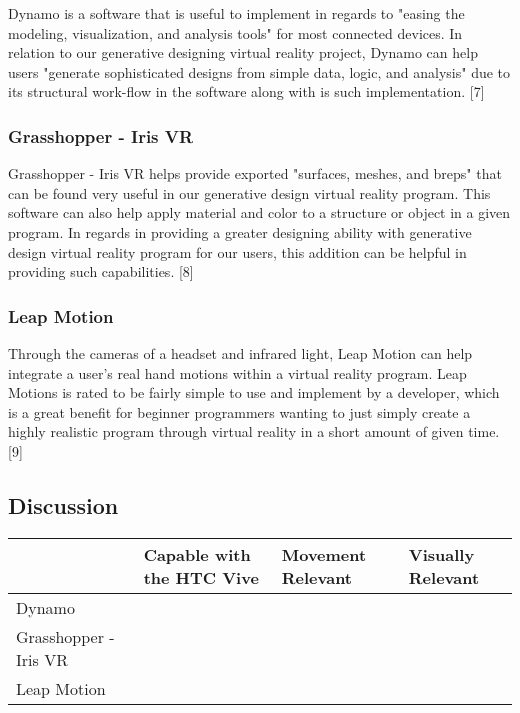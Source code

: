 \documentclass[letterpaper,10pt,onecolumn,compsoc]{IEEEtran}
\begin{document}

\noindent
Dynamo is a software that is useful to implement in regards to "easing the modeling, visualization, and analysis tools" for most connected devices. In relation to our generative designing virtual reality project, Dynamo can help users "generate sophisticated designs from simple data, logic, and analysis" due to its structural work-flow in the software along with is such implementation. [7]

\subsubsection{Grasshopper - Iris VR}


\noindent
Grasshopper - Iris VR helps provide exported "surfaces, meshes, and breps" that can be found very useful in our generative design virtual reality program. This software can also help apply material and color to a structure or object in a given program. In regards in providing a greater designing ability with generative design virtual reality program for our users, this addition can be helpful in providing such capabilities. [8] 

\subsubsection{Leap Motion}


\noindent
Through the cameras of a headset and infrared light, Leap Motion can help integrate a user's real hand motions within a virtual reality program. Leap Motions is rated to be fairly simple to use and implement by a developer, which is a great benefit for beginner programmers wanting to just simply create a highly realistic program through virtual reality in a short amount of given time. [9]

\subsection{Discussion}

\begin{center}
\begin{tabular}{ | P{3.5cm} | P{3cm} | P{2.5cm} | P{2.5cm} | } 
 	\hline
 	 & Capable with the HTC Vive & Movement Relevant & Visually Relevant \\ 
 	\hline
 	Dynamo & \checkmark & & \checkmark \\ 
 	\hline
 	Grasshopper - Iris VR & \checkmark & & \checkmark \\ 
 	\hline
 	Leap Motion & \checkmark & \checkmark & \\ 
 	\hline
\end{tabular}
\end{center}
\end{document}
